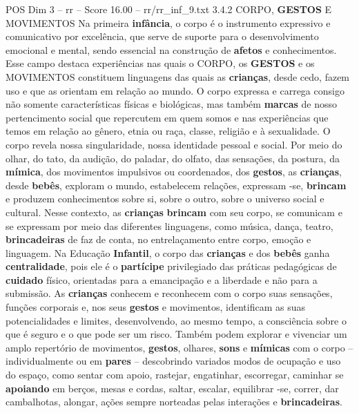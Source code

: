 \begin{textsample}{POS Dim 3 – rr – Score 16.00 – rr/rr\_inf\_9.txt}  \label{ex:f3_pos_228}
3.4.2 CORPO, \textbf{GESTOS} E MOVIMENTOS Na primeira \textbf{infância}, o corpo é o instrumento expressivo e comunicativo por excelência, que serve de suporte para o desenvolvimento emocional e mental, sendo essencial na construção de \textbf{afetos} e conhecimentos.
Esse campo destaca experiências nas quais o CORPO, os \textbf{GESTOS} e os MOVIMENTOS constituem linguagens das quais as \textbf{crianças}, desde cedo, fazem uso e que as orientam em relação ao mundo.
O corpo expressa e carrega consigo não somente características físicas e biológicas, mas também \textbf{marcas} de nosso pertencimento social que repercutem em quem somos e nas experiências que temos em relação ao gênero, etnia ou raça, classe, religião e à sexualidade.
O corpo revela nossa singularidade, nossa identidade pessoal e social.
Por meio do olhar, do tato, da audição, do paladar, do olfato, das sensações, da postura, da \textbf{mímica}, dos movimentos impulsivos ou coordenados, dos \textbf{gestos}, as \textbf{crianças}, desde \textbf{bebês}, exploram o mundo, estabelecem relações, expressam -se, \textbf{brincam} e produzem conhecimentos sobre si, sobre o outro, sobre o universo social e cultural.
Nesse contexto, as \textbf{crianças} \textbf{brincam} com seu corpo, se comunicam e se expressam por meio das diferentes linguagens, como música, dança, teatro, \textbf{brincadeiras} de faz de conta, no entrelaçamento entre corpo, emoção e linguagem.
Na Educação \textbf{Infantil}, o corpo das \textbf{crianças} e dos \textbf{bebês} ganha \textbf{centralidade}, pois ele é o \textbf{partícipe} privilegiado das práticas pedagógicas de \textbf{cuidado} físico, orientadas para a emancipação e a liberdade e não para a submissão.
As \textbf{crianças} conhecem e reconhecem com o corpo suas sensações, funções corporais e, nos seus \textbf{gestos} e movimentos, identificam as suas potencialidades e limites, desenvolvendo, ao mesmo tempo, a consciência sobre o que é seguro e o que pode ser um risco.
Também podem explorar e vivenciar um amplo repertório de movimentos, \textbf{gestos}, olhares, \textbf{sons} e \textbf{mímicas} com o corpo – individualmente ou em \textbf{pares} – descobrindo variados modos de ocupação e uso do espaço, como sentar com apoio, rastejar, engatinhar, escorregar, caminhar se \textbf{apoiando} em berços, mesas e cordas, saltar, escalar, equilibrar -se, correr, dar cambalhotas, alongar, ações sempre norteadas pelas interações e \textbf{brincadeiras}.

\end{textsample}
